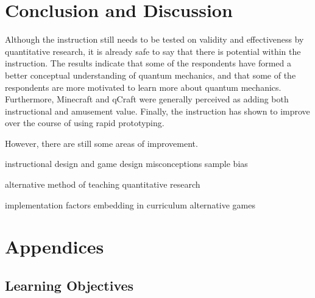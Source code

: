 \documentclass[11pt,twoside]{report} %
\begin{document}
\part{Conclusion and Discussion}

Although the instruction still needs to be tested on validity and effectiveness by quantitative research, it is already safe to say that there is potential within the instruction. The results indicate that some of the respondents have formed a better conceptual understanding of quantum mechanics, and that some of the respondents are more motivated to learn more about quantum mechanics. Furthermore, Minecraft and qCraft were generally perceived as adding both instructional and amusement value. Finally, the instruction has shown to improve over the course of using rapid prototyping.



However, there are still some areas of improvement. 

instructional design and game design
misconceptions
sample bias

alternative method of teaching
quantitative research

implementation factors
embedding in curriculum
alternative games




\part{Appendices}

\appendix

\chapter{Learning Objectives}
\label{app:learningobjectives}
\end{document}
